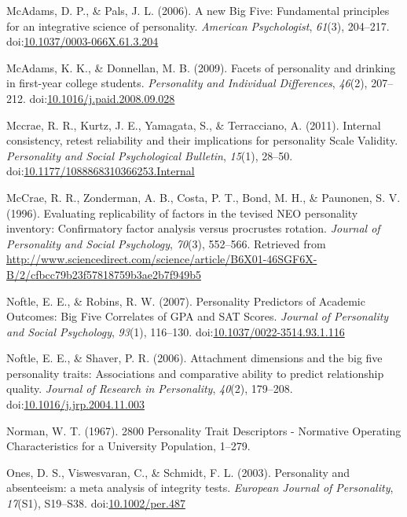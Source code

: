 \documentclass[,man,floatsintext]{apa6}
\begin{document}
\hypertarget{ref-McAdams2006a}{}
McAdams, D. P., \& Pals, J. L. (2006). A new Big Five: Fundamental
principles for an integrative science of personality. \emph{American
Psychologist}, \emph{61}(3), 204--217.
doi:\href{https://doi.org/10.1037/0003-066X.61.3.204}{10.1037/0003-066X.61.3.204}

\hypertarget{ref-McAdams2009}{}
McAdams, K. K., \& Donnellan, M. B. (2009). Facets of personality and
drinking in first-year college students. \emph{Personality and
Individual Differences}, \emph{46}(2), 207--212.
doi:\href{https://doi.org/10.1016/j.paid.2008.09.028}{10.1016/j.paid.2008.09.028}

\hypertarget{ref-Mccrae2011}{}
Mccrae, R. R., Kurtz, J. E., Yamagata, S., \& Terracciano, A. (2011).
Internal consistency, retest reliability and their implications for
personality Scale Validity. \emph{Personality and Social Psychological
Bulletin}, \emph{15}(1), 28--50.
doi:\href{https://doi.org/10.1177/1088868310366253.Internal}{10.1177/1088868310366253.Internal}

\hypertarget{ref-McCrae1996}{}
McCrae, R. R., Zonderman, A. B., Costa, P. T., Bond, M. H., \& Paunonen,
S. V. (1996). Evaluating replicability of factors in the tevised NEO
personality inventory: Confirmatory factor analysis versus procrustes
rotation. \emph{Journal of Personality and Social Psychology},
\emph{70}(3), 552--566. Retrieved from
\url{http://www.sciencedirect.com/science/article/B6X01-46SGF6X-B/2/cfbcc79b23f57818759b3ae2b7f949b5}

\hypertarget{ref-Noftle2007}{}
Noftle, E. E., \& Robins, R. W. (2007). Personality Predictors of
Academic Outcomes: Big Five Correlates of GPA and SAT Scores.
\emph{Journal of Personality and Social Psychology}, \emph{93}(1),
116--130.
doi:\href{https://doi.org/10.1037/0022-3514.93.1.116}{10.1037/0022-3514.93.1.116}

\hypertarget{ref-Noftle2006}{}
Noftle, E. E., \& Shaver, P. R. (2006). Attachment dimensions and the
big five personality traits: Associations and comparative ability to
predict relationship quality. \emph{Journal of Research in Personality},
\emph{40}(2), 179--208.
doi:\href{https://doi.org/10.1016/j.jrp.2004.11.003}{10.1016/j.jrp.2004.11.003}

\hypertarget{ref-Norman1967}{}
Norman, W. T. (1967). 2800 Personality Trait Descriptors - Normative
Operating Characteristics for a University Population, 1--279.

\hypertarget{ref-Ones2003}{}
Ones, D. S., Viswesvaran, C., \& Schmidt, F. L. (2003). Personality and
absenteeism: a meta analysis of integrity tests. \emph{European Journal
of Personality}, \emph{17}(S1), S19--S38.
doi:\href{https://doi.org/10.1002/per.487}{10.1002/per.487}
\end{document}
